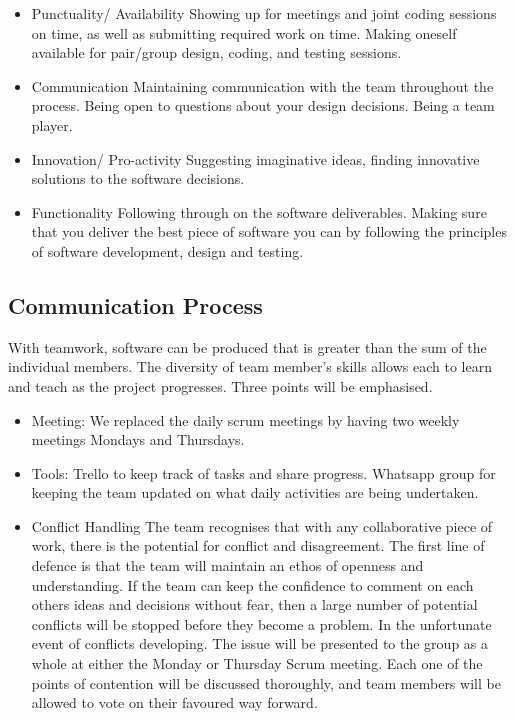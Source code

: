 \documentclass[11pt]{article}
\begin{document}
\begin{itemize}
	\item Punctuality/ Availability
	\subitem Showing up for meetings and joint coding sessions on time, as well as submitting required work on time.
	Making oneself available for pair/group design, coding, and testing sessions.
	
	\item Communication
	\subitem Maintaining communication with the team throughout the process. Being open to questions about your design decisions. Being a team player.
	
	\item Innovation/ Pro-activity
	\subitem Suggesting imaginative ideas, finding innovative solutions to the software decisions.
	
	\item Functionality
	\subitem Following through on the software deliverables. Making sure that you deliver the best piece of software you can by following the principles of software development, design and testing.
\end{itemize}

 \subsection{Communication Process}
With teamwork, software can be produced that is greater than the sum of the individual members. The diversity of team member's skills allows each to learn and teach as the project progresses. Three points will be emphasised.
  \begin{itemize}
  	\item Meeting: We replaced the daily scrum meetings by having two weekly meetings Mondays and Thursdays.
 	\item Tools: Trello to keep track of tasks and share progress. Whatsapp group for keeping the team updated on what daily activities are being undertaken.
  	\item Conflict Handling
 \subitem The team recognises that with any collaborative piece of work, there is the potential for conflict and disagreement. The first line of defence is that the team will maintain an ethos of openness and understanding. If the team can keep the confidence to comment on each others ideas and decisions without fear, then a large number of potential conflicts will be stopped before they become a problem.
 \subitem In the unfortunate event of conflicts developing. The issue will be presented to the group as a whole at either the Monday or Thursday Scrum meeting. Each one of the points of contention will be discussed thoroughly, and team members will be allowed to vote on their favoured way forward.
  \end{itemize}
\end{document}
